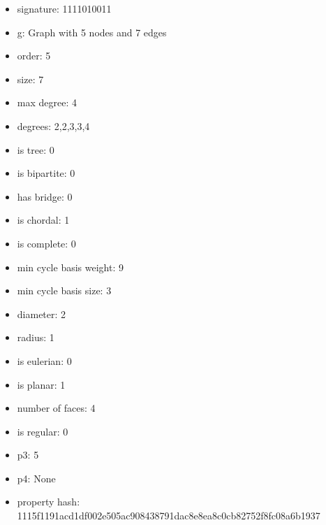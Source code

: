 \begin{itemize}
\item signature: 1111010011
\item g: Graph with 5 nodes and 7 edges
\item order: 5
\item size: 7
\item max degree: 4
\item degrees: 2,2,3,3,4
\item is tree: 0
\item is bipartite: 0
\item has bridge: 0
\item is chordal: 1
\item is complete: 0
\item min cycle basis weight: 9
\item min cycle basis size: 3
\item diameter: 2
\item radius: 1
\item is eulerian: 0
\item is planar: 1
\item number of faces: 4
\item is regular: 0
\item p3: 5
\item p4: None
\item property hash: 1115f1191acd1df002e505ac908438791dac8e8ea8c0cb82752f8fc08a6b1937
\end{itemize}
\newpage
